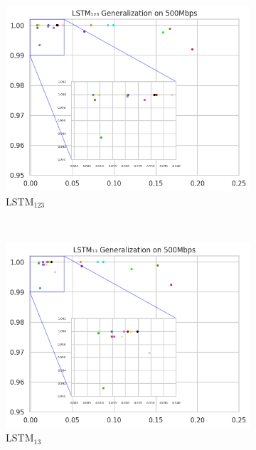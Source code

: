 \documentclass[a4paper,fleqn]{cas-sc}
\begin{document}
\begin{figure}[h!]
\begin{minipage}[t]{0.46\textwidth}
		\begin{subfigure}[t]{0.33\textwidth}
			\includegraphics[draft=false, width=\textwidth]{./figs/Generalizacao-LSTM123-500Mbps.png} 
			\caption{LSTM$_{123}$}
			\label{fig:Generalizacao-LSTM123-500Mbps}
		\end{subfigure}%
		~
		\begin{subfigure}[t]{0.33\textwidth}
			\includegraphics[draft=false, width=\textwidth]{./figs/Generalizacao-LSTM13-500Mbps.png} 
			\caption{LSTM$_{13}$}
			\label{fig:Generalizacao-LSTM13-500Mbps}
		\end{subfigure}%
		~
		\begin{subfigure}[t]{0.33\textwidth}

\end{subfigure}
\end{minipage}
\end{figure}
\end{document}
